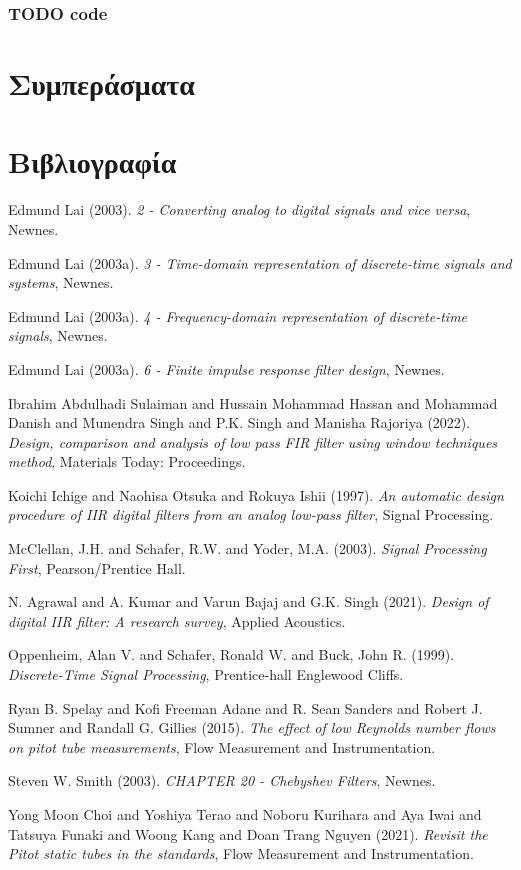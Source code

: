 \documentclass[breaklines=true, 12pt]{article}
\begin{document}
\subsubsection{{\bfseries\sffamily TODO} code}
\label{sec:orga2f0b12}

\section{Συμπεράσματα}
\label{sec:org1df6994}
\clearpage
\section{Βιβλιογραφία}
\label{sec:orgeb03d65}

\noindent
Edmund Lai (2003). \emph{2 - Converting analog to digital signals and vice versa}, Newnes.

\noindent
Edmund Lai (2003a). \emph{3 - Time-domain representation of discrete-time signals and systems}, Newnes.

\noindent
Edmund Lai (2003a). \emph{4 - Frequency-domain representation of discrete-time signals}, Newnes.

\noindent
Edmund Lai (2003a). \emph{6 - Finite impulse response filter design}, Newnes.

\noindent
Ibrahim Abdulhadi Sulaiman and Hussain Mohammad Hassan and Mohammad Danish and Munendra Singh and P.K. Singh and Manisha Rajoriya (2022). \emph{Design, comparison and analysis of low pass FIR filter using window techniques method}, Materials Today: Proceedings.

\noindent
Koichi Ichige and Naohisa Otsuka and Rokuya Ishii (1997). \emph{An automatic design procedure of IIR digital filters from an analog low-pass filter}, Signal Processing.

\noindent
McClellan, J.H. and Schafer, R.W. and Yoder, M.A. (2003). \emph{Signal Processing First}, Pearson/Prentice Hall.

\noindent
N. Agrawal and A. Kumar and Varun Bajaj and G.K. Singh (2021). \emph{Design of digital IIR filter: A research survey}, Applied Acoustics.

\noindent
Oppenheim, Alan V. and Schafer, Ronald W. and Buck, John R. (1999). \emph{Discrete-Time Signal Processing}, Prentice-hall Englewood Cliffs.

\noindent
Ryan B. Spelay and Kofi Freeman Adane and R. Sean Sanders and Robert J. Sumner and Randall G. Gillies (2015). \emph{The effect of low Reynolds number flows on pitot tube measurements}, Flow Measurement and Instrumentation.

\noindent
Steven W. Smith (2003). \emph{CHAPTER 20 - Chebyshev Filters}, Newnes.

\noindent
Yong Moon Choi and Yoshiya Terao and Noboru Kurihara and Aya Iwai and Tatsuya Funaki and Woong Kang and Doan Trang Nguyen (2021). \emph{Revisit the Pitot static tubes in the standards}, Flow Measurement and Instrumentation.
\end{document}
